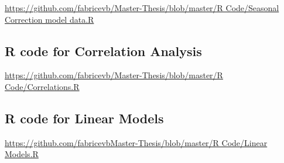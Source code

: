 \documentclass[12pt,a4paper,oneside]{book}
\begin{document}
\href{https://github.com/fabricevb/Master-Thesis/blob/master/R Code/Seasonal Correction model data.R}{https://github.com/fabricevb/Master-Thesis/blob/master/R Code/Seasonal Correction model data.R}


\subsection*{R code for Correlation Analysis}

\href{https://github.com/fabricevb/Master-Thesis/blob/master/R Code/Correlations.R}{https://github.com/fabricevb/Master-Thesis/blob/master/R Code/Correlations.R}




\subsection*{R code for Linear Models}

\href{https://github.com/fabricevb/Master-Thesis/blob/master/R Code/Linear Models.R}{https://github.com/fabricevbMaster-Thesis/blob/master/R Code/Linear Models.R}


\newpage
\end{document}
